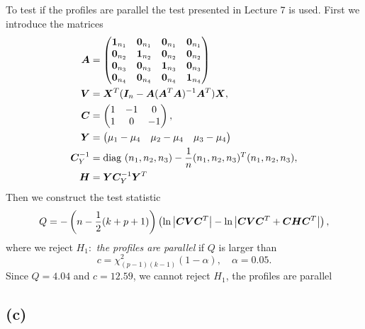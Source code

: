 To test if the profiles are parallel the test presented in Lecture
7 is used. First we introduce the matrices
\begin{align*}
  \bm{A} &=
         \begin{pmatrix}
           \bm{1}_{n_{1}}  & \bm{0}_{n_{1}}& \bm{0}_{n_{1}}& \bm{0}_{n_{1}} \\
           \bm{0}_{n_{2}} &  \bm{1}_{n_{2}}  &\bm{0}_{n_{2}}& \bm{0}_{n_{2}} \\
           \bm{0}_{n_{3}}& \bm{0}_{n_{3}}&  \bm{1}_{n_{3}}  & \bm{0}_{n_{3}} \\
           \bm{0}_{n_{4}}& \bm{0}_{n_{4}}& \bm{0}_{n_{4}} &   \bm{1}_{n_{4}}   \\ 
         \end{pmatrix} \\
  \bm{V} &= \bm{X}^{T} (\bm{I}_{n}   -  \bm{A}(\bm{A}^{T}\bm{A})^{-1}\bm{A}^{T}) \bm{X}, \\
  \bm{C} &=
         \begin{pmatrix}
           1 & -1 & 0 \\
           1 &  0 & -1
         \end{pmatrix}, \\
  \bm{Y} &=
         \begin{pmatrix}
            \mu_{1} - \mu_{4} & \mu_{2} - \mu_{4} & \mu_{3} - \mu_{4} 
         \end{pmatrix} \\
  \bm{C}_{Y}^{-1} &= \text{diag } (n_{1}, n_{2}, n_{3}) - \frac{1}{n}   (n_{1},
                  n_{2}, n_{3})^{T} (n_{1}, n_{2}, n_{3}), \\
  \bm{H} &= \bm{Y}\bm{C}_{Y}^{-1}\bm{Y}^{T}                  
\end{align*}
Then we construct the test statistic
\begin{equation*}
  Q = -
  \left(
    n - \frac{1}{2}(k + p + 1)
  \right)
  \left(
    \ln \left| \bm{CVC}^{T} \right| - \ln \left| \bm{CVC}^{T} + \bm{CHC}^{T} \right|
  \right) ,
\end{equation*}
where we reject $H_{1}: $ \textit{the profiles are parallel} if $Q$ is larger
than 
\begin{equation*}
  c = \chi^{2}_{(p-1)(k-1)}(1 - \alpha), \quad \alpha = 0.05.
\end{equation*}
Since $Q =4.04 $ and $c = 12.59$, we cannot reject $H_{1}$, the
profiles are parallel


\subsection*{(c)}
\label{sec:c-2}

